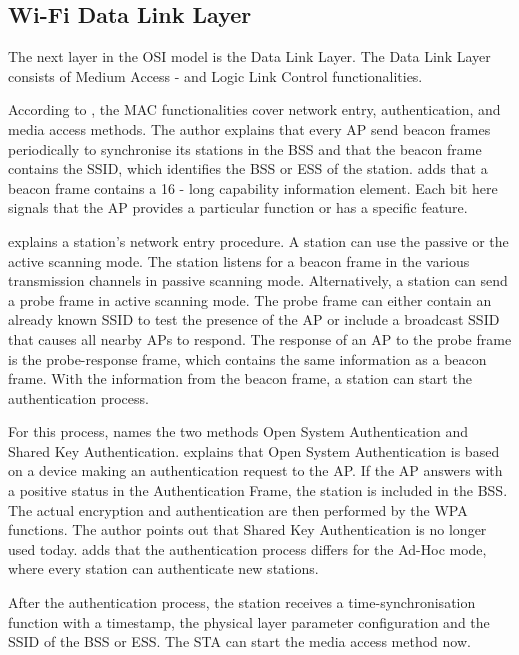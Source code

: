 \subsection*{Wi-Fi Data Link Layer}

The next layer in the OSI model is the Data Link Layer.
The Data Link Layer consists of Medium Access - and Logic Link Control functionalities.


According to \textcite{kauffels_wireless_2002}, the MAC functionalities cover network entry, authentication, and media access methods.
The author explains that every \ac{AP} send beacon frames periodically to synchronise its stations in the \ac{BSS} and that the beacon frame contains the \ac{SSID}, which identifies the \ac{BSS} or \ac{ESS} of the station. \textcite{sauter_wireless_2022} adds that a beacon frame contains a \SI{16}{\bit} - long capability information element. Each bit here signals that the \ac{AP} provides a particular function or has a specific feature.

\textcite{kauffels_wireless_2002} explains a station's network entry procedure.
A station can use the passive or the active scanning mode.
The station listens for a beacon frame in the various transmission channels in passive scanning mode.
Alternatively, a station can send a probe frame in active scanning mode.
The probe frame can either contain an already known \ac{SSID} to test the presence of the \ac{AP} or include a broadcast SSID that causes all nearby \ac{AP}s to respond.
The response of an \ac{AP} to the probe frame is the probe-response frame, which contains the same information as a beacon frame.
With the information from the beacon frame, a station can start the authentication process.

For this process, \textcite{kauffels_wireless_2002} names the two methods Open System Authentication and Shared Key Authentication.
\textcite{sauter_wireless_2022} explains that Open System Authentication is based on a device making an authentication
request to the \ac{AP}.
If the \ac{AP} answers with a positive status in the Authentication Frame,
the station is included in the \ac{BSS}.
The actual encryption and authentication are then performed by the \ac{WPA} functions.
The author points out that Shared Key Authentication is no longer used today.
\textcite{sommer_vehicular_2014} adds that the authentication process differs for the Ad-Hoc mode, where every station can
authenticate new stations.

After the authentication process, the station receives a time-synchronisation function with a timestamp, the physical layer
parameter configuration and the \ac{SSID} of the \ac{BSS} or \ac{ESS}.
The \ac{STA} can start the media access method now.

